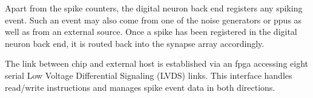 Apart from the spike counters, the digital neuron back end registers any spiking event. Such an event may also come from one of the noise generators or \glspl{ppu} as well as from an external source. Once a spike has been registered in the digital neuron back end, it is routed back into the synapse array accordingly. 

The link between chip and external host is established via an \gls{fpga} accessing eight serial Low Voltage Differential Signaling (LVDS) links. This interface handles read/write instructions and manages spike event data in both directions. %